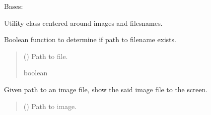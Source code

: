\documentclass[letterpaper,10pt,english]{sphinxmanual}
\begin{document}
\begin{fulllineitems}
\label{\detokenize{comp_viz.utils:comp_viz.utils.toolbox.Tools}}
\pysigstartsignatures
{}
\pysigstopsignatures
\sphinxAtStartPar
Bases: 

\sphinxAtStartPar
Utility class centered around images and filesnames.

\begin{fulllineitems}
\label{\detokenize{comp_viz.utils:comp_viz.utils.toolbox.Tools.exists}}
\pysigstartsignatures
{}
\pysigstopsignatures
\sphinxAtStartPar
Boolean function to determine if path to filename exists.
\begin{quote}\begin{description}
\sphinxAtStartPar
{} () \textendash{} Path to file.

\sphinxAtStartPar
boolean

\end{description}\end{quote}

\end{fulllineitems}


\begin{fulllineitems}
\label{\detokenize{comp_viz.utils:comp_viz.utils.toolbox.Tools.filename_resize_image}}
\pysigstartsignatures
{}
\pysigstopsignatures
\end{fulllineitems}


\begin{fulllineitems}
\label{\detokenize{comp_viz.utils:comp_viz.utils.toolbox.Tools.filename_show_image}}
\pysigstartsignatures
{}
\pysigstopsignatures
\sphinxAtStartPar
Given path to an image file, show the said image file to the screen.
\begin{quote}\begin{description}
\sphinxAtStartPar
{} () \textendash{} Path to image.


\end{description}
\end{quote}
\end{fulllineitems}
\end{fulllineitems}
\end{document}

